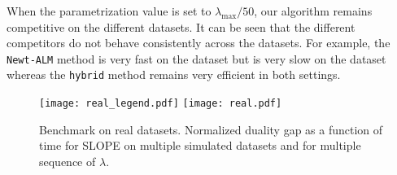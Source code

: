When the parametrization value is set to $\lambda_{\text{max}}/50$, our algorithm remains competitive on the different datasets.
It can be seen that the different competitors do not behave consistently across the datasets.
For example, the \texttt{Newt-ALM} method is very fast on the  dataset but is very slow on the  dataset whereas the \texttt{hybrid} method remains very efficient in both settings.

\begin{figure*}[!t]
  \centering
  \texttt{[image: real\_legend.pdf]}
  \texttt{[image: real.pdf]}
  \caption{Benchmark on real datasets. Normalized duality gap as a function of time for SLOPE on multiple simulated datasets and for multiple sequence of $\lambda$.}
  \label{fig:real-data}
\end{figure*}
